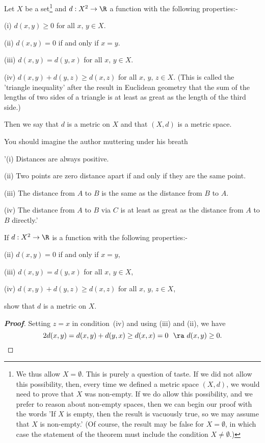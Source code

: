 \begin{definition}\label{D;metric}
Let $X$ be a set\footnote{We thus allow $X=\emptyset$.
This is purely a question of taste. If we did not
allow this possibility, then, every time we
defined a metric
space $(X,d)$, we would need to prove that $X$ was non-empty.
If we do allow this possibility, and we prefer
to reason about non-empty spaces, then we can begin our proof
with the words 'If $X$ is empty, then the result is
vacuously true, so we may assume that $X$ is non-empty.'
(Of course, the result may be false for $X=\emptyset$,
in which case the statement of the theorem must include
the condition $X\neq\emptyset$.)} and
$d:X^{2}\rightarrow\R$ a function with the
following properties:-

(i) $d(x,y)\geq 0$ for all $x,\,y\in X$.

(ii) $d(x,y)=0$ if and only if $x=y$.

(iii) $d(x,y)=d(y,x)$ for all $x,\,y\in X$.

(iv) $d(x,y)+d(y,z)\geq d(x,z)$ for all $x,\,y,\,z\in X$.
(This is called the 'triangle inequality' after the
result in Euclidean geometry that the sum of the lengths
of two sides of a triangle is at least as great as the
length of the third side.)

Then we say that $d$ is a metric on $X$ and that $(X,d)$
is a metric space.
\end{definition}
You should imagine the author muttering under his breath

'(i) Distances are always positive.

(ii) Two points are zero distance apart if and only
if they are the same point.

(iii) The distance from $A$ to $B$ is the same
as the distance from $B$ to $A$.

(iv) The distance from $A$ to $B$ via $C$
is at least as great as the distance from $A$ to $B$
directly.'

\begin{theorem}
If $d:X^{2}\rightarrow\R$ is a function with the
following properties:-

(ii) $d(x,y)=0$ if and only if $x=y$,

(iii) $d(x,y)=d(y,x)$ for all $x,\,y\in X$,

(iv) $d(x,y)+d(y,z)\geq d(x,z)$ for all $x,\,y,\,z\in X$,

\noindent show that $d$ is a metric on $X$.
\end{theorem}
\begin{proof}[\bf Proof] Setting $z=x$ in condition~(iv) and using
(iii) and (ii), we have
\[2d(x,y)=d(x,y)+d(y,x)\geq d(x,x)=0 \ \ \ra \ d(x,y)\geq 0 .\]
\end{proof}

